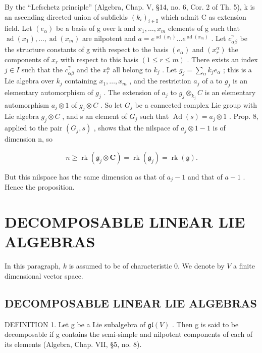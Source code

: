 By the ``Lefschetz principle'' (Algebra, Chap. V, §14, no. 6, Cor. 2 of Th. 5), k is an ascending directed union of subfields \((k_{i})_{i\in\mathrm{I}}\) which admit C as extension field. Let \((e_{\alpha})\) be a basis of g over k and \(x_{1},\ldots,x_{m}\) elements of g such that \(\operatorname{ad}(x_{1}),\ldots,\operatorname{ad}(x_{m})\) are nilpotent and \(a=e^{\operatorname{ad}(x_{1})}\ldots e^{\operatorname{ad}(x_{m})}\) . Let \(c_{\alpha\beta}^{\gamma}\) be the structure constants of g with respect to the basis \((e_{\alpha})\) and \((x_{r}^{\alpha})\) the components of \(x_{r}\) with respect to this basis \((1\leq r\leq m)\) . There exists an index \(j\in I\) such that the \(c_{\alpha\beta}^{\gamma}\) and the \(x_{r}^{\alpha}\) all belong to \(k_{j}\) . Let \(g_{j}=\sum_{\alpha}k_{j}e_{\alpha}\) ; this is a Lie algebra over \(k_{j}\) containing \(x_{1},\ldots,x_{m}\) , and the restriction \(a_{j}\) of a to \(g_{j}\) is an elementary automorphism of \(g_{j}\) . The extension of \(a_{j}\) to \(g_{j}\otimes_{k_{j}}C\) is an elementary automorphism \(a_{j}\otimes1\) of \(g_{j}\otimes C\) . So let \(G_{j}\) be a connected complex Lie group with Lie algebra \(g_{j}\otimes C\) , and s an element of \(G_{j}\) such that \(\operatorname{Ad}(s)=a_{j}\otimes1\) . Prop. 8, applied to the pair \((G_{j},s)\) , shows that the nilspace of \(a_{j}\otimes1-1\) is of dimension n, so

\[
n \geq \operatorname{rk} (\mathfrak {g} _ {j} \otimes \mathbf {C}) = \operatorname{rk} (\mathfrak {g} _ {j}) = \operatorname{rk} (\mathfrak {g}).
\]

But this nilspace has the same dimension as that of \(a_{j} - 1\) and that of \(a - 1\) . Hence the proposition.

\section{DECOMPOSABLE LINEAR LIE ALGEBRAS}

In this paragraph, \(k\) is assumed to be of characteristic 0. We denote by \(V\) a finite dimensional vector space.

\subsection{DECOMPOSABLE LINEAR LIE ALGEBRAS}

DEFINITION 1. Let g be a Lie subalgebra of \(\mathfrak{gl}(V)\) . Then g is said to be decomposable if g contains the semi-simple and nilpotent components of each of its elements (Algebra, Chap. VII, §5, no. 8).


